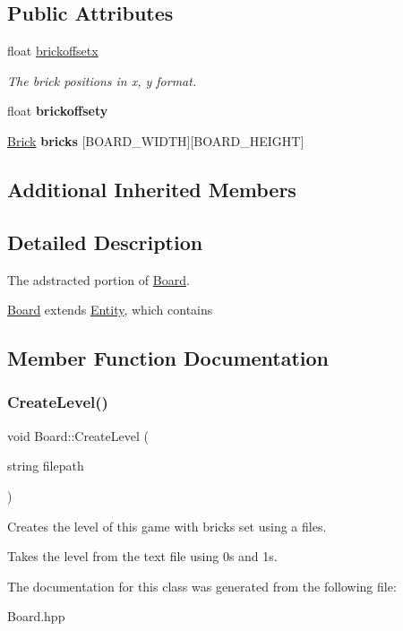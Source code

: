 \subsection*{Public Attributes}
\begin{DoxyCompactItemize}
\item 
\mbox{\label{classBoard_ad029c8458c69c5cdfe0b7accef5c96ec}} 
float \hyperlink{classBoard_ad029c8458c69c5cdfe0b7accef5c96ec}{brickoffsetx}
\begin{DoxyCompactList}\small\item\em The brick positions in x, y format. \end{DoxyCompactList}\item 
\mbox{\label{classBoard_a13ead003baf29a9d830a73629f2650f2}} 
float {\bfseries brickoffsety}
\item 
\mbox{\label{classBoard_accf8fbe944c20e73ded489d0d7d0837b}} 
\hyperlink{classBrick}{Brick} {\bfseries bricks} \mbox{[}B\+O\+A\+R\+D\+\_\+\+W\+I\+D\+TH\mbox{]}\mbox{[}B\+O\+A\+R\+D\+\_\+\+H\+E\+I\+G\+HT\mbox{]}
\end{DoxyCompactItemize}
\subsection*{Additional Inherited Members}


\subsection{Detailed Description}
The adstracted portion of \hyperlink{classBoard}{Board}. 

\hyperlink{classBoard}{Board} extends \hyperlink{classEntity}{Entity}, which contains 

\subsection{Member Function Documentation}
\mbox{\label{classBoard_a5238b7d770a9b834b8eff70af43c58b7}} 
\subsubsection{\texorpdfstring{Create\+Level()}{CreateLevel()}}
{\footnotesize\ttfamily void Board\+::\+Create\+Level (\begin{DoxyParamCaption}\item[{string}]{filepath }\end{DoxyParamCaption})}



Creates the level of this game with bricks set using a files. 

Takes the level from the text file using 0\textquotesingle{}s and 1\textquotesingle{}s. 

The documentation for this class was generated from the following file\+:\begin{DoxyCompactItemize}
\item 
Board.\+hpp\end{DoxyCompactItemize}
